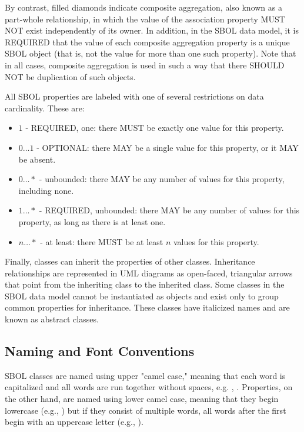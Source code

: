 By contrast, filled diamonds indicate composite aggregation, also known as a part-whole relationship, in which the value of the association property MUST NOT exist independently of its owner.
In addition, in the SBOL data model, it is REQUIRED that the value of each composite aggregation property is a unique SBOL object (that is, not the value for more than one such property).
Note that in all cases, composite aggregation is used in such a way that there SHOULD NOT be duplication of such objects.

All SBOL properties are labeled with one of several restrictions on data cardinality. These are:

\begin{itemize}

\item $1$ - REQUIRED, one: there MUST be exactly one value for this property.

\item $0 \ldots 1$ - OPTIONAL: there MAY be a single value for this property, or it MAY be absent.

\item $0 \ldots *$ - unbounded: there MAY be any number of values for this property, including none.

\item $1 \ldots *$ - REQUIRED, unbounded: there MAY be any number of values for this property, as long as there is at least one.

\item $n \ldots *$ - at least: there MUST be at least $n$ values for this property.

\end{itemize}

Finally, classes can inherit the properties of other classes. Inheritance relationships are represented in UML diagrams as open-faced, triangular arrows that point from the inheriting class to the inherited class. Some classes in the SBOL data model cannot be instantiated as objects and exist only to group common properties for inheritance. These classes have italicized names and are known as abstract classes.

\subsection{Naming and Font Conventions}
\label{sec:nameconventions}

SBOL classes are named using upper "camel case," meaning that each word is capitalized and all words are run together without spaces, e.g. , .
Properties, on the other hand, are named using lower camel case, meaning that they begin lowercase (e.g., ) but if they consist of multiple words, all words after the first begin with an uppercase letter (e.g., ).

